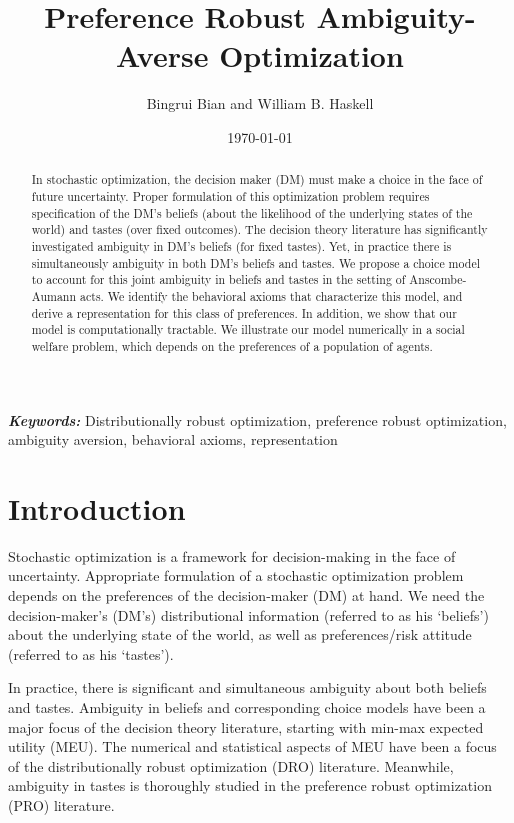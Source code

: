 \documentclass[11pt,oneside]{article}
\title{Preference Robust Ambiguity-Averse Optimization}
\author{Bingrui Bian and William B. Haskell}
\date{\today}
\theoremstyle{plain}
\theoremstyle{plain}
\theoremstyle{plain}
\theoremstyle{plain}
\theoremstyle{plain}
\theoremstyle{definition}
\theoremstyle{definition}
\theoremstyle{remark}
\theoremstyle{plain}
\providecommand{\keywords}[1]{\textbf{\textit{Keywords:}} #1}
\begin{document}
\maketitle


\begin{abstract}
In stochastic optimization, the decision maker (DM) must make a choice in the face of future uncertainty.
Proper formulation of this optimization problem requires specification of the DM's beliefs (about the likelihood of the underlying states of the world) and tastes (over fixed outcomes).
The decision theory literature has significantly investigated ambiguity in DM's beliefs (for fixed tastes).
Yet, in practice there is simultaneously ambiguity in both DM's beliefs and tastes.
We propose a choice model to account for this joint ambiguity in beliefs and tastes in the setting of Anscombe-Aumann acts.
We identify the behavioral axioms that characterize this model, and derive a representation for this class of preferences.
In addition, we show that our model is computationally tractable. We illustrate our model numerically in a social welfare problem, which depends on the preferences of a population of agents.
\end{abstract}

\keywords 
Distributionally robust optimization, preference robust optimization, ambiguity aversion, behavioral axioms, representation


\section{Introduction}

Stochastic optimization is a framework for decision-making in the face of uncertainty. 
Appropriate formulation of a stochastic optimization problem depends on the preferences of the decision-maker (DM) at hand.
We need the decision-maker's (DM's) distributional information (referred to as his `beliefs') about the underlying state of the world, as well as preferences/risk attitude (referred to as his `tastes').

In practice, there is significant and simultaneous ambiguity about both beliefs and tastes.
Ambiguity in beliefs and corresponding choice models have been a major focus of the decision theory literature, starting with min-max expected utility (MEU).
The numerical and statistical aspects of MEU have been a focus of the distributionally robust optimization (DRO) literature.
Meanwhile, ambiguity in tastes is thoroughly studied in the preference robust optimization (PRO) literature.
\end{document}

